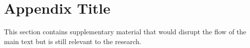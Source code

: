 \documentclass[12pt,a4paper]{report}
\begin{document}
\chapter{Appendix Title}  %
This section contains supplementary material that would disrupt the flow of the main text but is still relevant to the research.




\end{document}
